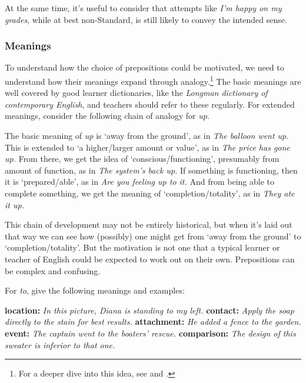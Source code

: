 At the same time, it's useful to consider that attempts like \textit{I'm happy on my grades}, while at best non-Standard, is still likely to convey the intended sense.

\subsubsection*{Meanings} \label{sec:preposition-meanings}

To understand how the choice of prepositions could be motivated, we need to
understand how their meanings expand through analogy.\footnote{For a deeper dive into this idea, see \citet{lakoff1980} and \citet{tyler2003}.} The basic meanings
are well covered by good learner dictionaries, like the \textit{Longman dictionary of
contemporary English}, and teachers should refer to these regularly. For extended
meanings, consider the following chain of analogy for \textit{up}.

The basic meaning of \textit{up} is `away from the ground', as in \textit{The balloon went up.}
This is extended to `a higher/larger amount or value', as in \textit{The price has gone up.}
From there, we get the idea of `conscious/functioning', presumably from amount
of function, as in \textit{The system's back up.} If something is functioning, then it is
`prepared/able', as in \textit{Are you feeling up to it.} And from being able to complete
something, we get the meaning of `completion/totality', as in \textit{They ate it up.} 

This chain of development may not be entirely historical, but when it's laid out
that way we can see how (possibly) one might get from `away from the ground'
to `completion/totality'. But the motivation is not one that a typical learner or
teacher of English could be expected to work out on their own. Prepositions can
be complex and confusing.

For \textit{to}, \citet{tyler2003} give the following meanings and examples:

\ea \label{ex:to-meanings}
    \ea \textbf{location:} \textit{In this picture, Diana is standing to my left.}
    \ex \textbf{contact:} \textit{Apply the soap directly to the stain for best results.}
    \ex \textbf{attachment:} \textit{He added a fence to the garden.}
    \ex \textbf{event:} \textit{The captain went to the boaters' rescue.}
    \ex \textbf{comparison:} \textit{The design of this sweater is inferior to that one.}
    \z
\z

